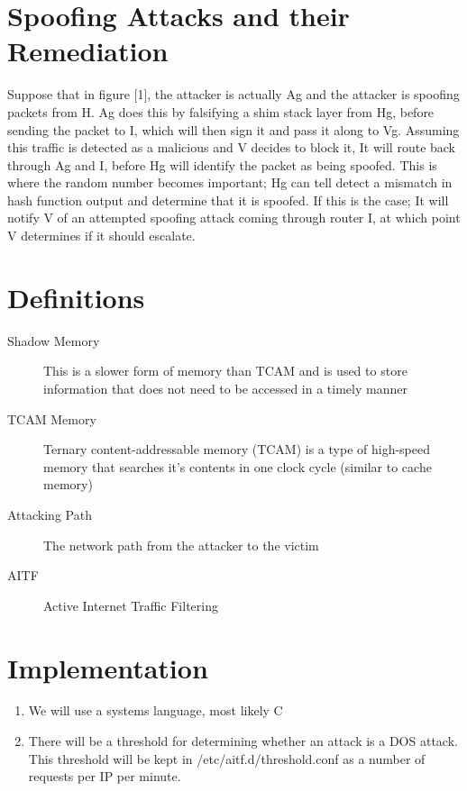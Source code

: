 \documentclass[11pt]{article}
\begin{document}
\section{Spoofing Attacks and their Remediation}
Suppose that in figure [1], the attacker is actually Ag and the attacker is
spoofing packets from H. Ag does this by falsifying a shim stack layer from Hg,
before sending the packet to I, which will then sign it and pass it along to
Vg. Assuming this traffic is detected as a malicious and V decides to block it,
It will route back through Ag and I, before Hg will identify the packet as
being spoofed. This is where the random number becomes important; Hg can tell
detect a mismatch in hash function output and determine that it is spoofed. If
this is the case; It will notify V of an attempted spoofing attack coming
through router I, at which point V determines if it should escalate.

\section{Definitions}
\begin{description}
	\item[Shadow Memory] This is a slower form of memory than TCAM and is used
	to store information that does not need to be accessed in a timely manner
	\item[TCAM Memory] Ternary content-addressable memory (TCAM) is a type of
	high-speed memory that searches it’s contents in one clock cycle
	(similar to cache memory)
	\item[Attacking Path] The network path from the attacker to the victim
	\item[AITF] Active Internet Traffic Filtering
\end{description}

\section{Implementation}
\begin{enumerate}
	\item We will use a systems language, most likely C
	\item There will be a threshold for determining whether an attack is a DOS
	attack. This threshold will be kept in /etc/aitf.d/threshold.conf as a
	number of requests per IP per minute.
\end{enumerate}
\end{document}
